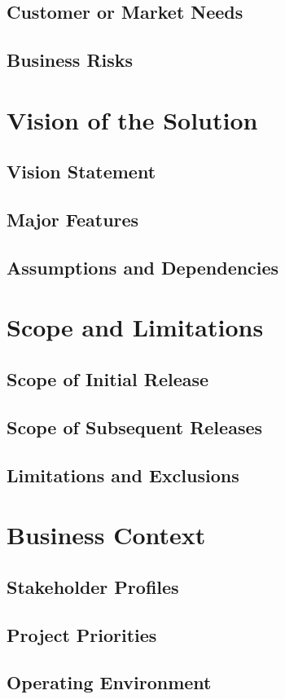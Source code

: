 \documentclass[12pt]{article}
\begin{document}
\subsection{Customer or Market Needs}

\subsection{Business Risks}


\section{Vision of the Solution}

\subsection{Vision Statement}

\subsection{Major Features}

\subsection{Assumptions and Dependencies}
 

\section{Scope and Limitations}

\subsection{Scope of Initial Release}

\subsection{Scope of Subsequent Releases}

\subsection{Limitations and Exclusions}


\section{Business Context}

\subsection{Stakeholder Profiles}

\subsection{Project Priorities}

\subsection{Operating Environment}
\end{document}
